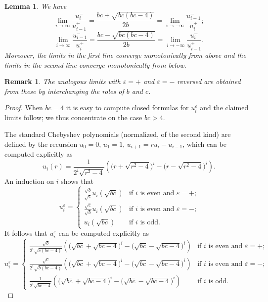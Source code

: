 \documentclass[pdflatex,sn-mathphys]{sn-jnl}%
\theoremstyle{thmstyleone}%
\newtheorem{lemma}[theorem]{Lemma}
\theoremstyle{thmstyletwo}%
\newtheorem{remark}[theorem]{Remark}%
\theoremstyle{thmstylethree}%
\begin{document}
  \begin{lemma}
    \label{le:limits}
    We have
    \[\lim_{i\to\infty} \frac{u_i^-}{u_{i-1}^+}=\frac{bc+\sqrt{bc(bc-4)}}{2b}=\lim_{i\to-\infty} \frac{u_{i-1}^-}{u_i^+};\]
    \[\lim_{i\to\infty} \frac{u_{i-1}^-}{u_i^+}=\frac{bc-\sqrt{bc(bc-4)}}{2b}=\lim_{i\to-\infty} \frac{u_i^-}{u_{i-1}^+}.\]
    Moreover, the limits in the first line converge monotonically from above and the limits in the second line converge monotonically from below.
  \end{lemma}
  \begin{remark}
    The analogous limits with $\varepsilon=+$ and $\varepsilon=-$ reversed are obtained from these by interchanging the roles of $b$ and $c$.
  \end{remark}
  \begin{proof}
    When $bc=4$ it is easy to compute closed formulas for $u_i^\varepsilon$ and the claimed limits follow; we thus concentrate on the case $bc>4$.

    The standard Chebyshev polynomials (normalized, of the second kind) are defined by the recursion $u_0=0$, $u_1=1$, $u_{i+1}=ru_i-u_{i-1}$, which can be computed explicitly as
    \[u_i(r)=\frac{1}{2^i\sqrt{r^2-4}}\left(\big(r+\sqrt{r^2-4}\big)^i-\big(r-\sqrt{r^2-4}\big)^i\right).\]
    An induction on $i$ shows that 
    \[u_i^\varepsilon=\begin{cases} \frac{\sqrt{b}}{\sqrt{c}}u_i(\sqrt{bc}) & \text{if $i$ is even and $\varepsilon=+$;}\\ \frac{\sqrt{c}}{\sqrt{b}}u_i(\sqrt{bc}) & \text{if $i$ is even and $\varepsilon=-$;}\\ u_i(\sqrt{bc}) & \text{if $i$ is odd.} \end{cases}\]
    It follows that $u_i^\varepsilon$ can be computed explicitly as
    \[u_i^\varepsilon=\begin{cases} \frac{\sqrt{b}}{2^i\sqrt{c(bc-4)}}\left(\big(\sqrt{bc}+\sqrt{bc-4}\big)^i-\big(\sqrt{bc}-\sqrt{bc-4}\big)^i\right) & \text{if $i$ is even and $\varepsilon=+$;}\\ \frac{\sqrt{c}}{2^i\sqrt{b(bc-4)}}\left(\big(\sqrt{bc}+\sqrt{bc-4}\big)^i-\big(\sqrt{bc}-\sqrt{bc-4}\big)^i\right) & \text{if $i$ is even and $\varepsilon=-$;}\\ \frac{1}{2^i\sqrt{bc-4}}\left(\big(\sqrt{bc}+\sqrt{bc-4}\big)^i-\big(\sqrt{bc}-\sqrt{bc-4}\big)^i\right) & \text{if $i$ is odd.} \end{cases}\]


\end{proof}
\end{document}
